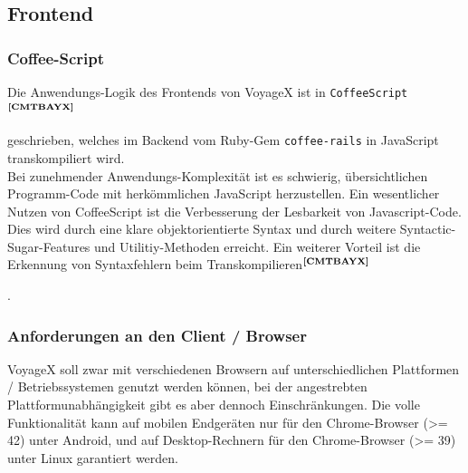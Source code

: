 \subsection{Frontend}\label{5_FE}

\subsubsection{Coffee-Script}
Die Anwendungs-Logik des Frontends von VoyageX ist in \texttt{CoffeeScript}$^{\textbf{\ref{CMTBAYX}}}$%
\addtocounter{footnote}{1}%
 geschrieben, welches im Backend vom Ruby-Gem \texttt{coffee-rails} in JavaScript transkompiliert wird.\\
Bei zunehmender Anwendungs-Komplexität ist es schwierig, übersichtlichen Programm-Code mit herkömmlichen JavaScript herzustellen. Ein wesentlicher Nutzen von CoffeeScript ist die Verbesserung der Lesbarkeit von Javascript-Code. Dies wird durch eine klare objektorientierte Syntax und durch weitere Syntactic-Sugar-Features und Utilitiy-Methoden erreicht. Ein weiterer Vorteil ist die Erkennung von Syntaxfehlern beim Transkompilieren$^{\textbf{\ref{CMTBAYX}}}$%
\addtocounter{footnote}{1}%
. 

\subsubsection{Anforderungen an den Client / Browser}\label{4_ACB}
VoyageX soll zwar mit verschiedenen Browsern auf unterschiedlichen Plattformen / Betriebssystemen genutzt werden können, bei der angestrebten Plattformunabhängigkeit gibt es aber dennoch Einschränkungen. Die volle Funktionalität kann auf mobilen Endgeräten nur für den Chrome-Browser (>= 42) unter Android, und auf Desktop-Rechnern für den Chrome-Browser (>= 39) unter Linux garantiert werden.

